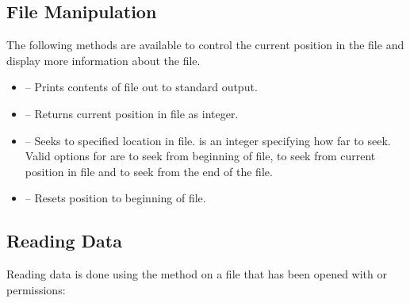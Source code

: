 \documentclass[a4paper,10pt,openany,english]{sphinxmanual}
\begin{document}
\subsection{File Manipulation}
\label{tutorial:file-manipulation}
The following methods are available to control the current position in the file and display more information about the file.
\begin{itemize}
\item {} 
 -- Prints contents of file out to standard output.

\item {} 
 -- Returns current position in file as integer.

\item {} 
 -- Seeks to specified location in file.  is an integer specifying how far to seek. Valid options for  are  to seek from beginning of file,  to seek from current position in file and  to seek from the end of the file.

\item {} 
 -- Resets position to beginning of file.

\end{itemize}


\subsection{Reading Data}
\label{tutorial:reading-data}
Reading data is done using the  method on a file that has been opened with  or  permissions:

\begin{sphinxVerbatim}[commandchars=\\\{\}]
 
  
  
  
\end{sphinxVerbatim}
\end{document}
